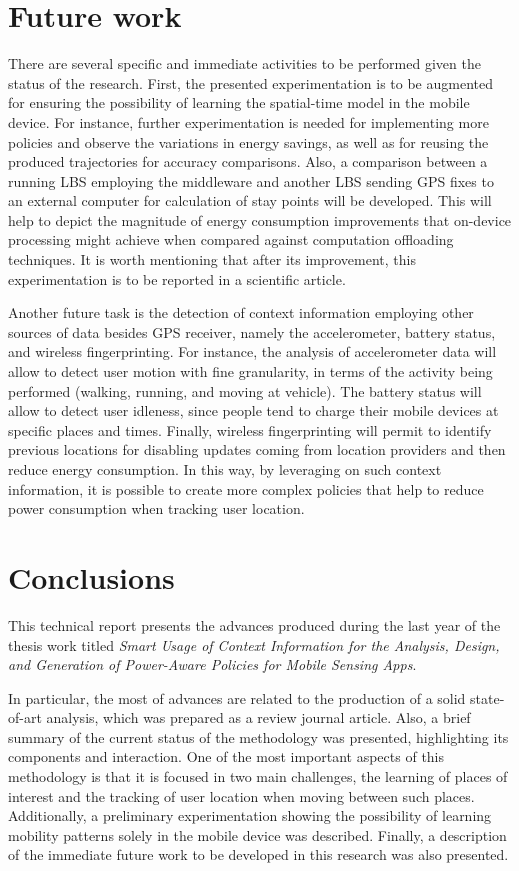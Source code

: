 \documentclass[ENG,PhD]{cinvestav}
\begin{document}
\section{Future work}
\label{sec:future-work}
There are several specific and immediate activities to be performed given the status of the research.
First, the presented experimentation is to be augmented for ensuring the possibility of learning the spatial-time model in the mobile device.
For instance, further experimentation is needed for implementing more policies and observe the variations in energy savings, as well as for reusing the produced trajectories for accuracy comparisons.
Also, a comparison between a running LBS employing the middleware and another LBS sending GPS fixes to an external computer for calculation of stay points will be developed.
This will help to depict the magnitude of energy consumption improvements that on-device processing might achieve when compared against computation offloading techniques.
It is worth mentioning that after its improvement, this experimentation is to be reported in a scientific article.

Another future task is the detection of context information employing other sources of data besides GPS receiver, namely the accelerometer, battery status, and wireless fingerprinting.
For instance, the analysis of accelerometer data will allow to detect user motion with fine granularity, in terms of the activity being performed (walking, running, and moving at vehicle).
The battery status will allow to detect user idleness, since people tend to charge their mobile devices at specific places and times.
Finally, wireless fingerprinting will permit to identify previous locations for disabling updates coming from location providers and then reduce energy consumption.
In this way, by leveraging on such context information, it is possible to create more complex policies that help to reduce power consumption when tracking user location.

\section{Conclusions}
\label{sec:conclusions}
This technical report presents the advances produced during the last year of the thesis work titled \emph{Smart Usage of Context Information for the Analysis, Design, and Generation of Power-Aware Policies for Mobile Sensing Apps}.

In particular, the most of advances are related to the production of a solid state-of-art analysis, which was prepared as a review journal article.
Also, a brief summary of the current status of the methodology was presented, highlighting its components and interaction.
One of the most important aspects of this methodology is that it is focused in two main challenges, the learning of places of interest and the tracking of user location when moving between such places.
Additionally, a preliminary experimentation showing the possibility of learning mobility patterns solely in the mobile device was described.
Finally, a description of the immediate future work to be developed in this research was also presented.



\end{document}
